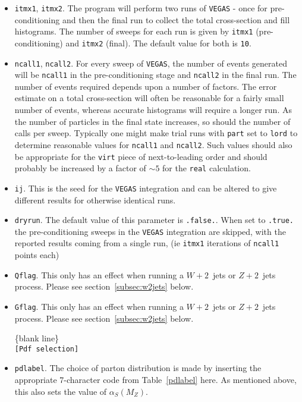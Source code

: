 \documentclass[12pt]{article}
\begin{document}
\begin{itemize}
\item {\tt itmx1}, {\tt itmx2}. The program will perform two runs of
{\tt VEGAS} - once for pre-conditioning and then the final run to
collect the total cross-section and fill histograms. The number of
sweeps for each run is given by {\tt itmx1} (pre-conditioning)
and {\tt itmx2} (final). The default value for both is {\tt 10}.


\item {\tt ncall1}, {\tt ncall2}. For every sweep of {\tt VEGAS},
the number of events generated will be {\tt ncall1} in the
pre-conditioning stage and {\tt ncall2} in the final run. The number
of events required depends upon a number of factors. The error
estimate on a total cross-section will often be reasonable for a
fairly small number of events, whereas accurate histograms will
require a longer run. As the number of particles in the final state
increases, so should the number of calls per sweep. Typically one
might make trial runs with {\tt part} set to {\tt lord} to determine
reasonable values for {\tt ncall1} and {\tt ncall2}. Such values
should also be appropriate for the {\tt virt} piece of
next-to-leading order and should probably be increased by a factor of
$\sim 5$ for the {\tt real} calculation.

\item {\tt ij}. This is the seed for the {\tt VEGAS} integration
and can be altered to give different results for otherwise identical
runs.

\item {\tt dryrun}. The default value of this parameter is
{\tt .false.}. When set to {\tt .true.} the pre-conditioning sweeps
in the {\tt VEGAS} integration are skipped, with the reported
results coming from a single run, (ie {\tt itmx1} iterations of 
{\tt ncall1} points each)
\item {\tt Qflag}. This only has an effect when running a
$W+2$~jets or $Z+2$~jets process. Please see section~\ref{subsec:w2jets}
below.

\item {\tt Gflag}. This only has an effect when running a
$W+2$~jets or $Z+2$~jets process. Please see section~\ref{subsec:w2jets}
below.

\begin{center}
\{blank line\} \\
{\tt [Pdf selection] }
\end{center}

\item {\tt pdlabel}. The choice of parton distribution is made by
inserting the appropriate 7-character code from Table~{\ref{pdlabel}}
here. As mentioned above, this also sets the value of $\alpha_S(M_Z)$.


\end{itemize}
\end{document}
